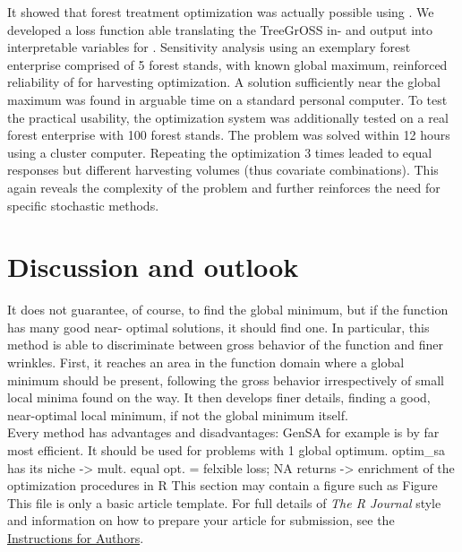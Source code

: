 It showed that forest treatment optimization was actually possible using . We developed a loss function able translating the TreeGrOSS in- and output into interpretable variables for . Sensitivity analysis using an exemplary forest enterprise comprised of 5 forest stands, with known global maximum, reinforced reliability of  for harvesting optimization. A solution sufficiently near the global maximum was found in arguable time on a standard personal computer. To test the practical usability, the optimization system was additionally tested on a real forest enterprise with 100 forest stands. The problem was solved within 12 hours using a cluster computer. Repeating the optimization 3 times leaded to equal responses but different harvesting volumes (thus covariate combinations). This again reveals the complexity of the problem and further reinforces the need for specific stochastic methods.


\section{Discussion and outlook}
It does not guarantee, of course, to find the global minimum, but if the function has many good near- optimal solutions, it should find one. In particular, this method is able to discriminate between gross behavior of the function and finer wrinkles. First, it reaches an area in the function domain where a global minimum should be present, following the gross behavior irrespectively of small local minima found on the way. It then develops finer details, finding a good, near-optimal local minimum, if not the global minimum itself.\\

Every method has advantages and disadvantages: GenSA for example is by far most efficient. It should be used for problems with 1 global optimum. optim\_sa has its niche -> mult. equal opt. = felxible loss; NA returns
-> enrichment of the optimization procedures in R  
This section may contain a figure such as Figure
This file is only a basic article template. For full details of \emph{The R Journal} style and information on how to prepare your article for submission, see the \href{http://journal.r-project.org/share/author-guide.pdf}{Instructions for Authors}.



\address{Author One\\
  Affiliation\\
  Address\\
  Country\\}

\address{Author Two\\
  Affiliation\\
  Address\\
  Country\\}

\address{Author Three\\
  Affiliation\\
  Address\\
  Country\\}
